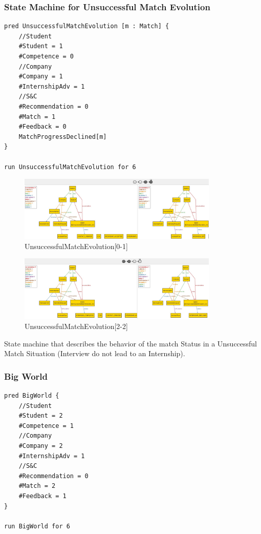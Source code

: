 \clearpage

\subsubsection{State Machine for Unsuccessful Match Evolution}
\begin{lstlisting}
pred UnsuccessfulMatchEvolution [m : Match] {
	//Student
	#Student = 1
	#Competence = 0
	//Company
	#Company = 1
	#InternshipAdv = 1
	//S&C
	#Recommendation = 0
	#Match = 1
	#Feedback = 0
	MatchProgressDeclined[m]
}

run UnsuccessfulMatchEvolution for 6
\end{lstlisting}

\begin{figure}[h]
    \centering
    \includegraphics[width=0.85\textwidth]{Images/AlloyModel_images/UnsuccessfulMatchEvolution[0-1].png}
\caption{UnsuccessfulMatchEvolution[0-1]}
    \label{fig:figure2}
\end{figure}
\begin{figure}[h]
    \centering
    \includegraphics[width=0.85\textwidth]{Images/AlloyModel_images/UnsuccessfulMatchEvolution[2-2].png}
    \caption{UnsuccessfulMatchEvolution[2-2]}
    \label{fig:figure2}
\end{figure}
State machine that describes the behavior of the match Status in a Unsuccessful Match Situation (Interview do not lead to an Internship).

\clearpage

\subsubsection{Big World}
\begin{lstlisting}
pred BigWorld {
	//Student
	#Student = 2
	#Competence = 1
	//Company
	#Company = 2
	#InternshipAdv = 1
	//S&C
	#Recommendation = 0
	#Match = 2
	#Feedback = 1
}

run BigWorld for 6
\end{lstlisting}

